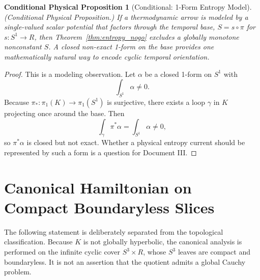 \documentclass[11pt]{article}
\theoremstyle{canonmath}
\theoremstyle{canonpostulate}
\theoremstyle{canonproposition}
\newtheorem{proposition}{Conditional Physical Proposition}[section]
\providecommand{\Klein}{\mathcal{K}}
\providecommand{\R}{\mathbb{R}}
\providecommand{\Sone}{S^1}
\providecommand{\Sthree}{S^3}
\def\mathbb#1{#1}%
\def\mathcal#1{#1}%
\begin{document}
\begin{proposition}[Conditional: 1-Form Entropy Model] \label{prop:1form}
\emph{(Conditional Physical Proposition.)} If a thermodynamic arrow is modeled by a single-valued scalar potential that factors through the temporal base, $S=s\circ\pi$ for $s:\Sone\to\R$, then Theorem~\ref{thm:entropy_nogo} excludes a globally monotone nonconstant $S$. A closed non-exact 1-form on the base provides one mathematically natural way to encode cyclic temporal orientation.
\end{proposition}
\begin{proof}
This is a modeling observation. Let $\alpha$ be a closed 1-form on $\Sone$ with
\[
\int_{\Sone}\alpha\neq0.
\]
Because $\pi_*:\pi_1(\Klein)\to\pi_1(\Sone)$ is surjective, there exists a loop $\gamma$ in $\Klein$ projecting once around the base. Then
\[
\int_\gamma\pi^*\alpha=\int_{\Sone}\alpha\neq0,
\]
so $\pi^*\alpha$ is closed but not exact. Whether a physical entropy current should be represented by such a form is a question for Document III.
\end{proof}

\section{Canonical Hamiltonian on Compact Boundaryless Slices}

The following statement is deliberately separated from the topological classification. Because $\Klein$ is not globally hyperbolic, the canonical analysis is performed on the infinite cyclic cover $\Sthree\times\R$, whose $\Sthree$ leaves are compact and boundaryless. It is not an assertion that the quotient admits a global Cauchy problem.
\end{document}
